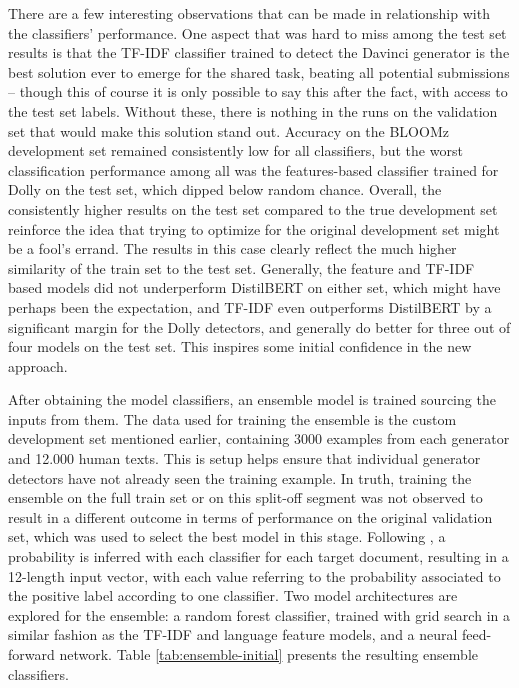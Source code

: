 There are a few interesting observations that can be made in relationship with the classifiers' performance.
One aspect that was hard to miss among the test set results is that the TF-IDF classifier trained to detect the Davinci generator is the best solution ever to emerge for the shared task, beating all potential submissions -- though this of course it is only possible to say this after the fact, with access to the test set labels.
Without these, there is nothing in the runs on the validation set that would make this solution stand out.
Accuracy on the BLOOMz development set remained consistently low for all classifiers, but the worst classification performance among all was the features-based classifier trained for Dolly on the test set, which dipped below random chance.
Overall, the consistently higher results on the test set compared to the true development set reinforce the idea that trying to optimize for the original development set might be a fool's errand.
The results in this case clearly reflect the much higher similarity of the train set to the test set.
Generally, the feature and TF-IDF based models did not underperform DistilBERT on either set, which might have perhaps been the expectation, and TF-IDF even outperforms DistilBERT by a significant margin for the Dolly detectors, and generally do better for three out of four models on the test set.
This inspires some initial confidence in the new approach.

After obtaining the model classifiers, an ensemble model is trained sourcing the inputs from them.
The data used for training the ensemble is the custom development set mentioned earlier, containing 3000 examples from each generator and 12.000 human texts.
This is setup helps ensure that individual generator detectors have not already seen the training example.
In truth, training the ensemble on the full train set or on this split-off segment was not observed to result in a different outcome in terms of performance on the original validation set, which was used to select the best model in this stage.
Following \citet{frohling2021feature}, a probability is inferred with each classifier for each target document, resulting in a 12-length input vector, with each value referring to the probability associated to the positive label according to one classifier.
Two model architectures are explored for the ensemble: a random forest classifier, trained with grid search in a similar fashion as the TF-IDF and language feature models, and a neural feed-forward network.
Table \ref{tab:ensemble-initial} presents the resulting ensemble classifiers.

